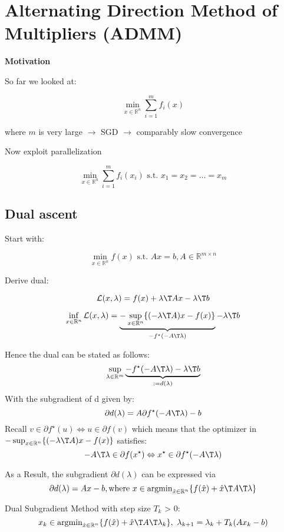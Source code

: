 \section{Alternating Direction Method of Multipliers (ADMM)}

\textbf{Motivation}

So far we looked  at:

\begin{equation}
	\min_{x \in \mathbb{R}^{n}} \sum_{i = 1}^{m} f_i(x)
	\label{eq:sum_f_i}
\end{equation}

where $m$ is very large
$\rightarrow$
SGD
$\rightarrow$
comparably slow convergence

Now exploit parallelization

$$\min_{x\in\mathbb{R}^{n}}
	\sum_{i = 1}^{m} f_i(x_i)
	\text{ s.t. }x_1=x_2=\dots=x_m$$

\subsection{Dual ascent}

Start with:

$$\min_{x \in \mathbb{R}^{n}} f(x)
	\text{ s.t. } Ax=b, A \in \mathbb{R}^{m\times n}$$

Derive dual:

$$\mathcal{L}(x,\lambda) = f(x) + \lambda\T Ax-\lambda\T  b$$

$$\inf_{x \in \mathbb{R}^n}\mathcal{L}(x,\lambda) =
	\underbrace{-\sup_{x\in\mathbb{R}^n}\{(-\lambda\T A)x-f(x)\}}
	_{-f^\star(-A\T\lambda)}
	-\lambda\T b$$

Hence the dual can be stated as follows:
$$
	\sup_{\lambda\in\mathbb{R}^m}
	\underbrace{-f^\star(-A\T\lambda)-\lambda\T b}
	_{:=d(\lambda)}
$$
With the subgradient of d given by:
$$
	\partial d(\lambda)=A\partial f^\star(-A\T\lambda)- b
$$
Recall
$v\in\partial f^\star(u) \Leftrightarrow u\in\partial f(v)$
which means that the optimizer in
$-\sup_{x\in\mathbb{R}^n}\{(-\lambda\T A)x-f(x)\}$
satisfies:
$$
	-A\T\lambda\in\partial f(x^\star)
	\Leftrightarrow
	x^\star\in\partial f^\star(-A\T\lambda)
$$

As a Result, the subgradient $\partial d(\lambda)$ can be expressed via
$$
	\partial d(\lambda)=Ax-b, \text{where }
	x\in\operatorname{argmin}_{\hat{x}\in\mathbb{R}^{n}}
	\{ f(\hat{x})+\hat{x}\T A\T\lambda \}
$$

Dual Subgradient Method with step size $T_k$ > 0:
$$
	x_k\in\operatorname{argmin}_{\hat{x}\in\mathbb{R}^{n}}
	\{ f(\hat{x})+\hat{x}\T A\T\lambda_k\},\
	\lambda_{k+1}=\lambda_k+T_k(Ax_k-b)
$$
